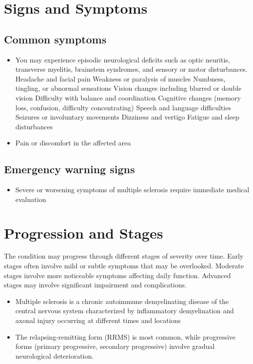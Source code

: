 \section{Signs and Symptoms}

\subsection{Common symptoms}
\begin{itemize}[noitemsep]
  \item You may experience episodic neurological deficits such as optic neuritis, transverse myelitis, brainstem syndromes, and sensory or motor disturbances. Headache and facial pain Weakness or paralysis of muscles Numbness, tingling, or abnormal sensations Vision changes including blurred or double vision Difficulty with balance and coordination Cognitive changes (memory loss, confusion, difficulty concentrating) Speech and language difficulties Seizures or involuntary movements Dizziness and vertigo Fatigue and sleep disturbances
  \item Pain or discomfort in the affected area
  \end{itemize}

\subsection{Emergency warning signs}
\begin{itemize}[noitemsep]
  \item Severe or worsening symptoms of multiple sclerosis require immediate medical evaluation
\end{itemize}
\section{Progression and Stages}
The condition may progress through different stages of severity over time. Early stages often involve mild or subtle symptoms that may be overlooked. Moderate stages involve more noticeable symptoms affecting daily function. Advanced stages may involve significant impairment and complications.

\begin{itemize}[noitemsep]
  \item Multiple sclerosis is a chronic autoimmune demyelinating disease of the central nervous system characterized by inflammatory demyelination and axonal injury occurring at different times and locations
  \item The relapsing-remitting form (RRMS) is most common, while progressive forms (primary progressive, secondary progressive) involve gradual neurological deterioration.
\end{itemize}

